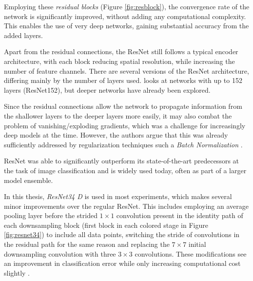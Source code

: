 Employing these \emph{residual blocks} (Figure \ref{fig:resblock}), the convergence rate of the network is significantly improved, without adding any computational complexity. 
This enables the use of very deep networks, gaining substantial accuracy from the added layers.

Apart from the residual connections, the ResNet still follows a typical encoder architecture, with each block reducing spatial resolution, while increasing the number of feature channels.
There are several versions of the ResNet architecture, differing mainly by the number of layers used. 
 looks at networks with up to 152 layers (ResNet152), but deeper networks have already been explored. 

Since the residual connections allow the network to propagate information from the shallower layers to the deeper layers more easily, it may also combat the problem of vanishing/exploding gradients, which was a challenge for increasingly deep models at the time. 
However, the authors argue that this was already sufficiently addressed by regularization techniques such a \emph{Batch Normalization} \cite{ioffeBatchNormalizationAccelerating2015}.

ResNet was able to significantly outperform its state-of-the-art predecessors at the task of image classification and is widely used today, often as part of a larger model ensemble.

In this thesis, \emph{ResNet34 D} is used in most experiments, which makes several minor improvements over the regular ResNet.
This includes employing an average pooling layer before the strided $1\times 1$ convolution present in the identity path of each downsampling block (first block in each colored stage in Figure \ref{fig:resnet34}) to include all data points, switching the stride of convolutions in the residual path for the same reason and replacing the $7\times 7$ initial downsampling convolution with three $3\times 3$ convolutions.
These modifications see an improvement in classification error while only increasing computational cost slightly \cite{heBagTricksImage2018}.

